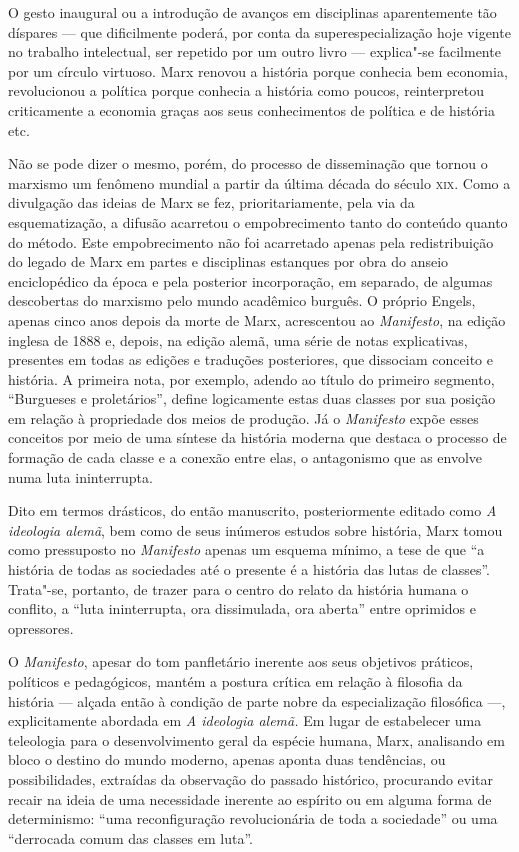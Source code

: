 O gesto inaugural ou a introdução de avanços em disciplinas
aparentemente tão díspares --- que dificilmente poderá, por conta da
superespecialização hoje vigente no trabalho intelectual, ser repetido
por um outro livro --- explica"-se facilmente por um círculo virtuoso.
Marx renovou a história porque conhecia bem economia, revolucionou a
política porque conhecia a história como poucos, reinterpretou
criticamente a economia graças aos seus conhecimentos de política e de
história etc.

Não se pode dizer o mesmo, porém, do processo de disseminação que tornou
o marxismo um fenômeno mundial a partir da última década do século \textsc{xix}.
Como a divulgação das ideias de Marx se fez, prioritariamente, pela via da
esquematização, a difusão acarretou o empobrecimento tanto do conteúdo
quanto do método. Este empobrecimento não foi acarretado apenas pela
redistribuição do legado de Marx em partes e disciplinas estanques por
obra do anseio enciclopédico da época e pela posterior incorporação, em
separado, de algumas descobertas do marxismo pelo mundo acadêmico
burguês. O próprio Engels, apenas cinco anos depois da morte de Marx,
acrescentou ao \textit{Manifesto}, na edição inglesa de 1888 e, depois,
na edição alemã, uma série de notas explicativas, presentes em todas as
edições e traduções posteriores, que dissociam conceito e história. A
primeira nota, por exemplo, adendo ao título do primeiro segmento,
“Burgueses e proletários”, define logicamente estas duas classes por
sua posição em relação à propriedade dos meios de produção. Já o
\textit{Manifesto} expõe esses conceitos por meio de uma síntese da
história moderna que destaca o processo de formação de cada classe e a
conexão entre elas, o antagonismo que as envolve numa luta
ininterrupta.

Dito em termos drásticos, do então manuscrito, posteriormente editado
como \textit{A ideologia alemã}, bem como de seus inúmeros estudos
sobre história, Marx tomou como pressuposto no \textit{Manifesto}
apenas um esquema mínimo, a tese de que “a história de todas as
sociedades até o presente é a história das lutas de classes”.
Trata"-se, portanto, de trazer para o centro do relato da história
humana o conflito, a “luta ininterrupta, ora dissimulada, ora aberta”
entre oprimidos e opressores.

O \textit{Manifesto}, apesar do tom panfletário inerente aos seus
objetivos práticos, políticos e pedagógicos, mantém a postura crítica
em relação à filosofia da história --- alçada então à condição de parte
nobre da especialização filosófica ---, explicitamente abordada em
\textit{A ideologia alemã.} Em lugar de estabelecer uma teleologia para
o desenvolvimento geral da espécie humana, Marx, analisando em bloco o
destino do mundo moderno, apenas aponta duas tendências, ou
possibilidades, extraídas da observação do passado histórico,
procurando evitar recair na ideia de uma necessidade inerente ao
espírito ou em alguma forma de determinismo: “uma reconfiguração
revolucionária de toda a sociedade” ou uma “derrocada comum das classes
em luta”.

